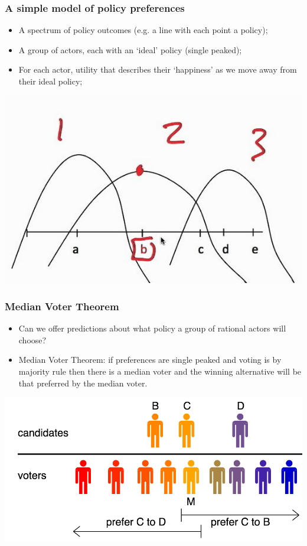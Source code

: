 \documentclass[aspectratio=169]{beamer}
\theoremstyle{principle}
\begin{document}
\begin{frame}
\frametitle{A simple model of policy preferences}
\begin{itemize}
\item A spectrum of policy outcomes (e.g. a line with each point a policy);
\bigskip
\item A group of actors, each with an `ideal' policy (single peaked);
\bigskip
\item For each actor, utility that describes their `happiness' as we move away from their ideal policy;
\end{itemize}
    \begin{center}
     \includegraphics[scale=0.5]{sp.png}
     \end{center}
\end{frame}

\begin{frame}
\frametitle{Median Voter Theorem}
\begin{itemize}
\item Can we offer predictions about what policy a group of rational actors will choose?
\bigskip
\bigskip
\item Median Voter Theorem: if preferences are single peaked and voting is by majority rule then there is a median voter and the winning alternative will be that preferred by the median voter.
\end{itemize}
    \begin{center}
     \includegraphics[scale=0.25]{Median_voter.png}
     \end{center}
\end{frame}
\end{document}
